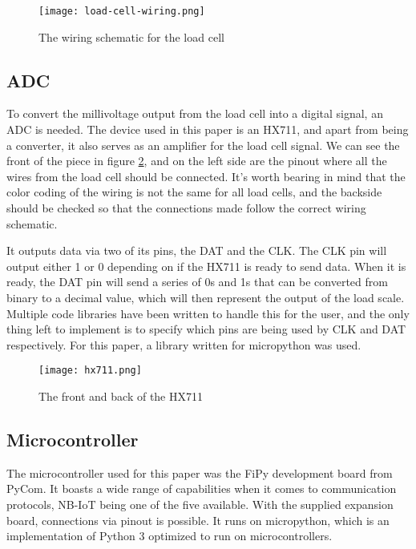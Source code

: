 \begin{figure}[h]
	\centering
	\texttt{[image: load-cell-wiring.png]}
	\caption{The wiring schematic for the load cell}
	\label{fig:wiring}
\end{figure}


\subsection{ADC}
To convert the millivoltage output from the load cell into a digital signal, an ADC is needed. The device used in this paper is an HX711, and apart from being a converter, it also serves as an amplifier for the load cell signal. We can see the front of the piece in figure \ref{fig:hx711}, and on the left side are the pinout where all the wires from the load cell should be connected. It's worth bearing in mind that the color coding of the wiring is not the same for all load cells, and the backside should be checked so that the connections made follow the correct wiring schematic. 

It outputs data via two of its pins, the DAT and the CLK. The CLK pin will output either 1 or 0 depending on if the HX711 is ready to send data. When it is ready, the DAT pin will send  a series of 0s and 1s that can be converted from binary to a decimal value, which will then represent the output of the load scale.\cite{hx711-datasheet} Multiple code libraries have been written to handle this for the user, and the only thing left to implement is to specify which pins are being used by CLK and DAT respectively. For this paper, a library written for micropython was used.\cite{hx711-lopy}

\begin{figure}[h]
	\centering
	\texttt{[image: hx711.png]}
	\caption{The front and back of the HX711}
	\label{fig:hx711}
\end{figure}


\subsection{Microcontroller}
The microcontroller used for this paper was the FiPy development board from PyCom. It boasts a wide range of capabilities when it comes to communication protocols, NB-IoT being one of the five available.\cite{fipy-docs} With the supplied expansion board, connections via pinout is possible. It runs on micropython, which is an implementation of Python 3 optimized to run on microcontrollers.\cite{micropython}

